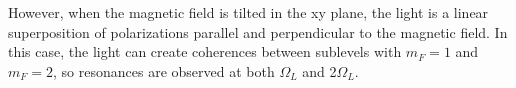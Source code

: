 However, when the magnetic field is tilted  in the xy plane, the light is a linear superposition of polarizations parallel and perpendicular to the magnetic field. In this case, the light can create coherences between sublevels with $m_F=1$ and $m_F=2$, so resonances are observed at both $ \Omega_L$ and 2$\Omega_L$. 
 
